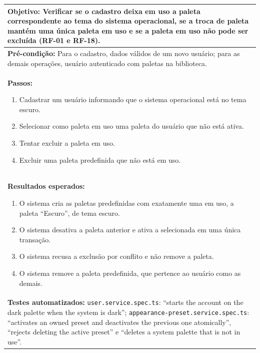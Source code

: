 \FloatBarrier
\begin{quadro}[h!]
\caption{Caso de teste CT06: validar a paleta em uso}
\label{quad:ct06}
\begin{tabular}{|p{\dimexpr\linewidth-2\tabcolsep-2\arrayrulewidth\relax}|}
\hline
\textbf{Objetivo:} Verificar se o cadastro deixa em uso a paleta correspondente ao tema do sistema operacional, se a troca de paleta mantém uma única paleta em uso e se a paleta em uso não pode ser excluída (RF-01 e RF-18). \\ \hline
\textbf{Pré-condição:} Para o cadastro, dados válidos de um novo usuário; para as demais operações, usuário autenticado com paletas na biblioteca. \\ \hline
\textbf{Passos:}
\begin{enumerate}[nosep,leftmargin=1.2em,topsep=2pt,partopsep=0pt,parsep=0pt,itemsep=1pt]
  \item Cadastrar um usuário informando que o sistema operacional está no tema escuro.
  \item Selecionar como paleta em uso uma paleta do usuário que não está ativa.
  \item Tentar excluir a paleta em uso.
  \item Excluir uma paleta predefinida que não está em uso.
\end{enumerate} \\ \hline
\textbf{Resultados esperados:}
\begin{enumerate}[nosep,leftmargin=1.2em,topsep=2pt,partopsep=0pt,parsep=0pt,itemsep=1pt]
  \item O sistema cria as paletas predefinidas com exatamente uma em uso, a paleta ``Escuro'', de tema escuro.
  \item O sistema desativa a paleta anterior e ativa a selecionada em uma única transação.
  \item O sistema recusa a exclusão por conflito e não remove a paleta.
  \item O sistema remove a paleta predefinida, que pertence ao usuário como as demais.
\end{enumerate} \\ \hline
\textbf{Testes automatizados:} \texttt{user.service.spec.ts}: ``starts the account on the dark palette when the system is dark''; \texttt{appearance-preset.service.spec.ts}: ``activates an owned preset and deactivates the previous one atomically'', ``rejects deleting the active preset'' e ``deletes a system palette that is not in use''. \\ \hline
\end{tabular}
\end{quadro}

